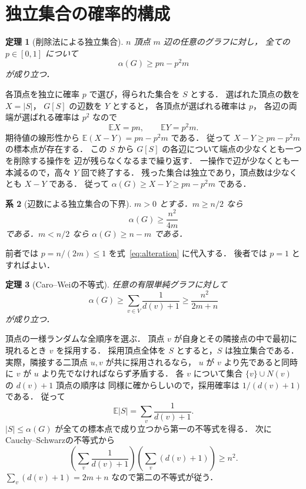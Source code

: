 \documentclass[a5paper,10pt,onecolumn]{jsarticle}
\makeatletter
\theoremstyle{mathnotetheorem}
\newtheorem{theorem}{定理}[section]
\newtheorem{corollary}[theorem]{系}
\renewcommand{\proofname}{証明}
\renewenvironment{proof}[1][\proofname]{%
  \par\pushQED{\qed}\normalfont\topsep4\p@\@plus2\p@\relax
  \trivlist\item[\hskip\labelsep\bfseries #1]\ignorespaces
}{\popQED\endtrivlist\@endpefalse}
\makeatother
\begin{document}
\section{独立集合の確率的構成}
\begin{theorem}[削除法による独立集合]\label{thm:alteration}
$n$ 頂点 $m$ 辺の任意のグラフに対し，
全ての $p\in[0,1]$ について
\begin{equation}\label{eq:alteration}
 \alpha(G)\ge pn-p^2m
\end{equation}
が成り立つ．
\end{theorem}
\begin{proof}
各頂点を独立に確率 $p$ で選び，得られた集合を $S$ とする．
選ばれた頂点の数を $X=|S|$，
$G[S]$ の辺数を $Y$ とすると，
各頂点が選ばれる確率は $p$，
各辺の両端が選ばれる確率は $p^2$ なので
\[
 \mathbb EX=pn,\qquad \mathbb EY=p^2m.
\]
期待値の線形性から
$\mathbb E(X-Y)=pn-p^2m$ である．
従って $X-Y\ge pn-p^2m$ の標本点が存在する．
この $S$ から $G[S]$ の各辺について端点の少なくとも一つを削除する操作を
辺が残らなくなるまで繰り返す．
一操作で辺が少なくとも一本減るので，高々 $Y$ 回で終了する．
残った集合は独立であり，頂点数は少なくとも $X-Y$ である．
従って $\alpha(G)\ge X-Y\ge pn-p^2m$ である．
\end{proof}

\begin{corollary}[辺数による独立集合の下界]
$m>0$ とする．$m\ge n/2$ なら
\[
 \alpha(G)\ge\frac{n^2}{4m}
\]
である．$m<n/2$ なら
$\alpha(G)\ge n-m$ である．
\end{corollary}
\begin{proof}
前者では $p=n/(2m)\le1$ を式~\eqref{eq:alteration} に代入する．
後者では $p=1$ とすればよい．
\end{proof}

\begin{theorem}[Caro--Weiの不等式]\label{thm:carowei}
任意の有限単純グラフに対して
\begin{equation}\label{eq:carowei}
 \alpha(G)\ge\sum_{v\in V}\frac1{d(v)+1}
 \ge\frac{n^2}{2m+n}
\end{equation}
が成り立つ．
\end{theorem}
\begin{proof}
頂点の一様ランダムな全順序を選ぶ．
頂点 $v$ が自身とその隣接点の中で最初に現れるとき $v$ を採用する．
採用頂点全体を $S$ とすると，$S$ は独立集合である．
実際，隣接する二頂点 $u,v$ が共に採用されるなら，
$u$ が $v$ より先であると同時に $v$ が $u$ より先でなければならず矛盾する．
各 $v$ について集合 $\{v\}\cup N(v)$ の $d(v)+1$ 頂点の順序は
同様に確からしいので，採用確率は $1/(d(v)+1)$ である．
従って
\[
 \mathbb E|S|=\sum_v\frac1{d(v)+1}.
\]
$|S|\le\alpha(G)$ が全ての標本点で成り立つから第一の不等式を得る．
次にCauchy--Schwarzの不等式から
\[
 \left(\sum_v\frac1{d(v)+1}\right)
 \left(\sum_v(d(v)+1)\right)\ge n^2.
\]
$\sum_v(d(v)+1)=2m+n$ なので第二の不等式が従う．
\end{proof}
\end{document}
